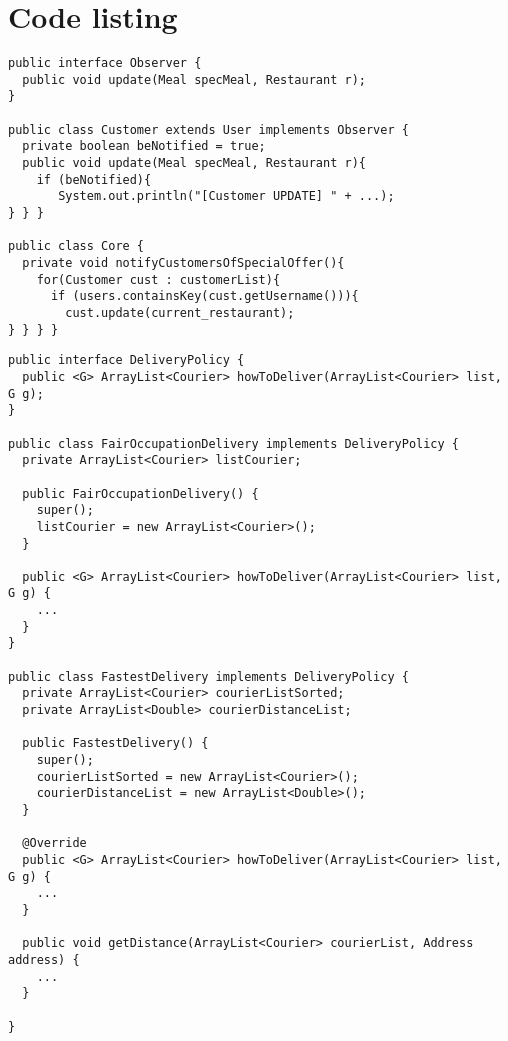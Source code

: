 \section{Code listing} %
\label{app:code_listing}

\lstset{basicstyle=\rm\footnotesize\ttfamily}

\begin{lstlisting}[caption=\emph{Observer} pattern for \texttt{Customer} and \texttt{Meal}.,
label=lst:observer]
public interface Observer {
  public void update(Meal specMeal, Restaurant r);
}

public class Customer extends User implements Observer {
  private boolean beNotified = true;
  public void update(Meal specMeal, Restaurant r){
    if (beNotified){
       System.out.println("[Customer UPDATE] " + ...);
} } }

public class Core {
  private void notifyCustomersOfSpecialOffer(){
    for(Customer cust : customerList){
      if (users.containsKey(cust.getUsername())){
        cust.update(current_restaurant);
} } } }
\end{lstlisting}

\begin{lstlisting}[caption=\emph{Strategy} pattern for the \texttt|DeliveryPolicy|.,
label=lst:strategy]
public interface DeliveryPolicy {
  public <G> ArrayList<Courier> howToDeliver(ArrayList<Courier> list, G g); 
}

public class FairOccupationDelivery implements DeliveryPolicy {
  private ArrayList<Courier> listCourier;
  
  public FairOccupationDelivery() {
  	super();
  	listCourier = new ArrayList<Courier>();
  }
  
  public <G> ArrayList<Courier> howToDeliver(ArrayList<Courier> list, G g) {
  	...
  }
}

public class FastestDelivery implements DeliveryPolicy {
  private ArrayList<Courier> courierListSorted;
  private ArrayList<Double> courierDistanceList;

  public FastestDelivery() {
  	super();
  	courierListSorted = new ArrayList<Courier>();
  	courierDistanceList = new ArrayList<Double>();
  }
 
  @Override
  public <G> ArrayList<Courier> howToDeliver(ArrayList<Courier> list, G g) {
  	...
  }
  
  public void getDistance(ArrayList<Courier> courierList, Address address) {
    ...
  }
  
}
\end{lstlisting}


